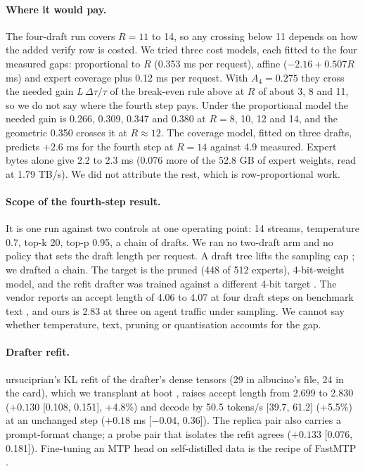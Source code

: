 \paragraph{Where it would pay.}
The four-draft run covers $R=11$ to 14, so any crossing below 11 depends on how the added verify row is costed. %
We tried three cost models, each fitted to the four measured gaps: proportional to $R$ (0.353 ms per request), affine ($-2.16+0.507R$ ms) and expert coverage plus 0.12 ms per request. %
With $A_4=0.275$ they cross the needed gain $L\,\Delta\tau/\tau$ of the break-even rule above at $R$ of about 3, 8 and 11, so we do not say where the fourth step pays. %
Under the proportional model the needed gain is 0.266, 0.309, 0.347 and 0.380 at $R=8$, 10, 12 and 14, and the geometric 0.350 crosses it at $R\approx12$. %
The coverage model, fitted on three drafts, predicts $+2.6$ ms for the fourth step at $R=14$ against 4.9 measured. Expert bytes alone give 2.2 to 2.3 ms (0.076 more of the 52.8 GB of expert weights, read at 1.79 TB/s). We did not attribute the rest, which is row-proportional work. %

\paragraph{Scope of the fourth-step result.}
It is one run against two controls at one operating point: 14 streams, temperature 0.7, top-k 20, top-p 0.95, a chain of drafts. %
We ran no two-draft arm and no policy that sets the draft length per request.
A draft tree lifts the sampling cap \citep{chen2024sequoia}; we drafted a chain. %
The target is the pruned (448 of 512 experts), 4-bit-weight model, and the refit drafter was trained against a different 4-bit target \citep{ursuciprian2026d3}. The vendor reports an accept length of 4.06 to 4.07 at four draft steps on benchmark text \citep{qiu2026qwen38next}, and ours is 2.83 at three on agent traffic under sampling. We cannot say whether temperature, text, pruning or quantisation accounts for the gap. %

\paragraph{Drafter refit.}
ursuciprian's KL refit of the drafter's dense tensors (29 in albucino's file, 24 in the card), which we transplant at boot \citep{ursuciprian2026d3,albucino2026drafter}, raises accept length from 2.699 to 2.830 ($+0.130$ [0.108, 0.151], +4.8\%) and decode by 50.5 tokens/s [39.7, 61.2] (+5.5\%) at an unchanged step ($+0.18$ ms [$-0.04$, 0.36]). %
The replica pair also carries a prompt-format change; a probe pair that isolates the refit agrees ($+0.133$ [0.076, 0.181]). %
Fine-tuning an MTP head on self-distilled data is the recipe of FastMTP \citep{cai2025fastmtp}. %

